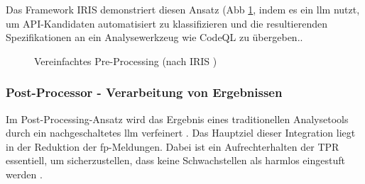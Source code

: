 Das Framework  IRIS demonstriert diesen Ansatz (Abb \ref{fig:pre_processing_pattern}, indem es ein \ac{llm} nutzt, um API-Kandidaten automatisiert zu klassifizieren und die resultierenden Spezifikationen an ein Analysewerkzeug wie CodeQL zu übergeben.\cite{liIRISLLMAssistedStatic2024}.

\begin{figure}[h]
\centering
\caption{Vereinfachtes Pre-Processing (nach IRIS \cite{liIRISLLMAssistedStatic2024})}
\label{fig:pre_processing_pattern}
\end{figure}

\subsubsection{Post-Processor - Verarbeitung von Ergebnissen}
Im Post-Processing-Ansatz wird das Ergebnis eines traditionellen Analysetools durch ein nachgeschaltetes \ac{llm} verfeinert \cite{wagnerEffectiveComplementarySecurity2025}. Das Hauptziel dieser Integration liegt in der Reduktion der \ac{fp}-Meldungen. Dabei ist ein Aufrechterhalten der \ac{TPR} essentiell, um sicherzustellen, dass keine Schwachstellen als harmlos eingestuft werden \cite{wagnerEffectiveComplementarySecurity2025}.

